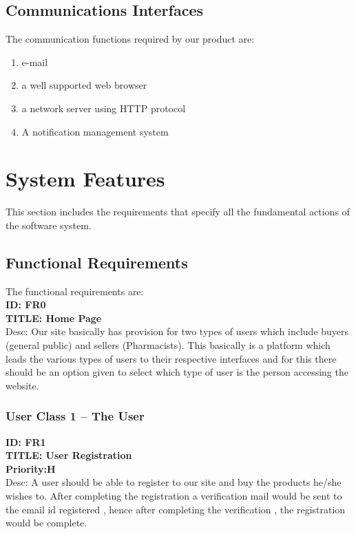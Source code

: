 \documentclass{scrreprt}
\begin{document}
\section{Communications Interfaces}
The communication functions required by our product are:
\begin{enumerate}
\item e-mail 
\item a well supported web browser
\item a network server using HTTP protocol
\item A notification management system
\end{enumerate}

\chapter{System Features}
This section includes the requirements that specify all the fundamental actions of the software system.


\section{Functional Requirements}
The functional requirements are:  \\

\textbf{ID: FR0}   \\
\textbf{TITLE: Home Page}   \\
Desc: Our site basically has provision for two types of users which include buyers (general public) and sellers (Pharmacists). This basically is a platform which leads the various types of users to their respective interfaces and for this there should be an option given to select which type of user is the person accessing the website.  \\


\subsection{User Class 1 – The User}  

\textbf{ID: FR1}  \\
\textbf{TITLE: User Registration}  \\
\textbf{Priority:H}  \\
Desc: A user should be able to register to our site and buy the products he/she wishes to. After completing the registration a verification mail would be sent to the email id registered , hence after completing the verification , the registration would be complete.   \\
\end{document}
